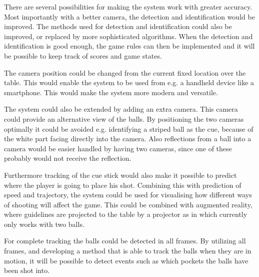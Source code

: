 There are several possibilities for making the system work with greater accuracy. Most importantly with a better camera, the detection and identification would be improved. The methods used for detection and identification could also be improved, or replaced by more sophisticated algorithms. When the detection and identification is good enough, the game rules can then be implemented and it will be possible to keep track of scores and game states.

The camera position could be changed from the current fixed location over the table. This would enable the system to be used from e.g. a handheld device like a smartphone. This would make the system more modern and versatile.

The system could also be extended by adding an extra camera. This camera could provide an alternative view of the balls. By positioning the two cameras optimally it could be avoided e.g. identifying a striped ball as the cue, because of the white part facing directly into the camera. Also reflections from a ball into a camera would be easier handled by having two cameras, since one of these probably would not receive the reflection.

Furthermore tracking of the cue stick would also make it possible to predict where the player is going to place his shot. Combining this with prediction of speed and trajectory, the system could be used for visualising how different ways of shooting will affect the game. This could be combined with augmented reality, where guidelines are projected to the table by a projector as in \cite{larsbopool} which currently only works with two balls.

For complete tracking the balls could be detected in all frames. By utilizing all frames, and developing a method that is able to track the balls when they are in motion, it will be possible to detect events such as which pockets the balls have been shot into.
